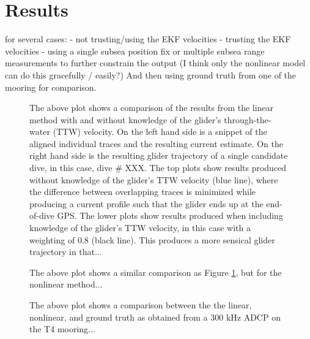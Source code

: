 \section{Results}

 for several cases:
- not trusting/using  the EKF velocities
- trusting the EKF velocities
- using a single subsea position fix or multiple subsea range measurements to further constrain the output (I think only the nonlinear model can do this gracefully / easily?)
And then using ground truth from one of the mooring for comparison.

\begin{figure}%
  \vspace{1.5in}
  \caption{The above plot shows a comparison of the results from the linear method with and without knowledge of the glider's through-the-water (TTW) velocity. On the left hand side is a snippet of the aligned individual traces and the resulting current estimate. On the right hand side is the resulting glider trajectory of a single candidate dive, in this case, dive \# XXX. The top plots show results produced without knowledge of the glider's TTW velocity (blue line), where the difference between overlapping traces is minimized while producing a current profile such that the glider ends up at the end-of-dive GPS. The lower plots show results produced when including knowledge of the glider's TTW velocity, in this case with a weighting of 0.8 (black line). This produces a more sensical glider trajectory in that...}
  \label{fig.linear}
\end{figure}


\begin{figure}%
  \vspace{1.5in}
  \caption{The above plot shows a similar comparison as Figure \ref{fig.linear}, but for the nonlinear method...}
  \label{fig.nonlinear}
\end{figure}

\begin{figure}%
  \vspace{1.5in}
  \caption{The above plot shows a comparison between the the linear, nonlinear, and ground truth as obtained from a 300 kHz ADCP on the T4 mooring...}
  \label{fig.mooring}
\end{figure}


